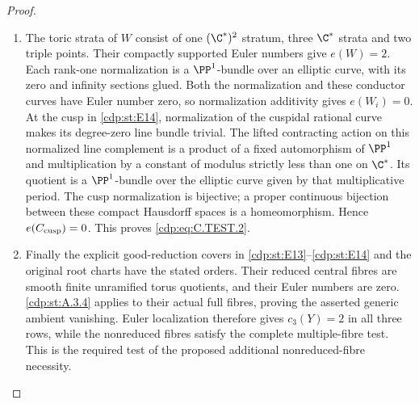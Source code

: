 \begin{proof}
\begin{enumerate}[label={$\langle1\rangle$\arabic*.},leftmargin=*]
\item The toric strata of $W$ consist of one $(\C^*)^2$ stratum,
three $\C^*$ strata and two triple points. Their compactly
supported Euler numbers give $e(W)=2$.
Each rank-one normalization is a $\PP^1$-bundle over an
elliptic curve, with its zero and infinity sections glued.
Both the normalization and these conductor curves have
Euler number zero, so normalization additivity gives
$e(W_i)=0$. At the cusp in \ref{cdp:st:E14}, normalization of the
cuspidal rational curve makes its degree-zero line bundle
trivial. The lifted contracting action on this normalized
line complement is a product of a fixed automorphism of
$\PP^1$ and multiplication by a constant of modulus
strictly less than one on $\C^*$. Its quotient is a
$\PP^1$-bundle over the elliptic curve given by that
multiplicative period. The cusp normalization is
bijective; a proper continuous bijection between these
compact Hausdorff spaces is a homeomorphism. Hence
$e(C_{\rm cusp})=0$. This proves \eqref{cdp:eq:C.TEST.2}.

\item Finally the explicit good-reduction covers in \ref{cdp:st:E13}--\ref{cdp:st:E14}
and the original root charts have the stated orders.
Their reduced central fibres are smooth finite unramified
torus quotients, and their Euler numbers are zero.
\ref{cdp:st:A.3.4} applies to their actual full fibres, proving the
asserted generic ambient vanishing. Euler localization
therefore gives $c_3(Y)=2$ in all three rows, while the
nonreduced fibres satisfy the complete multiple-fibre
test. This is the required test of the proposed additional
nonreduced-fibre necessity.

\end{enumerate}
\end{proof}
